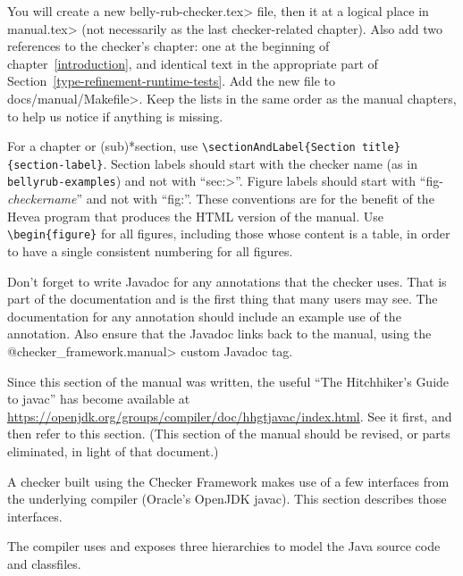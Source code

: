 You will create a new \<belly-rub-checker.tex> file,
then \verb|| it at a logical place in \<manual.tex> (not
necessarily as the last checker-related chapter).  Also add two references
to the checker's chapter:  one at the beginning of
chapter~\ref{introduction}, and identical text in the appropriate part of
Section~\ref{type-refinement-runtime-tests}.  Add the new file to
\<docs/manual/Makefile>.  Keep the lists in
the same order as the manual chapters, to help us notice if anything is
missing.

For a chapter or (sub)*section, use \verb|\sectionAndLabel{Section title}{section-label}|.
Section labels should start with the checker
name (as in \verb|bellyrub-examples|) and not with ``\<sec:>''.
Figure labels should start with ``fig-\emph{checkername}'' and not with ``fig:''.
These conventions are for the benefit of the Hevea program that produces
the HTML version of the manual.
Use \verb|\begin{figure}| for all figures, including those whose
content is a table, in order to have a single consistent numbering for all
figures.

Don't forget to write Javadoc for any annotations that the checker uses.
That is part of the documentation and is the first thing that many users
may see.  The documentation for any annotation should include an example
use of the annotation.
Also ensure that the Javadoc links back to the manual, using the
\<@checker\_framework.manual> custom Javadoc tag.



Since this section of the manual was written, the useful ``The Hitchhiker's
Guide to javac'' has become available at
\url{https://openjdk.org/groups/compiler/doc/hhgtjavac/index.html}.
See it first, and then refer to this section.  (This section of the manual
should be revised, or parts eliminated, in light of that document.)


A checker built using the Checker Framework makes use of a few interfaces
from the underlying compiler (Oracle's OpenJDK javac).
This section describes those interfaces.





The compiler uses and exposes three hierarchies to model the Java
source code and classfiles.




